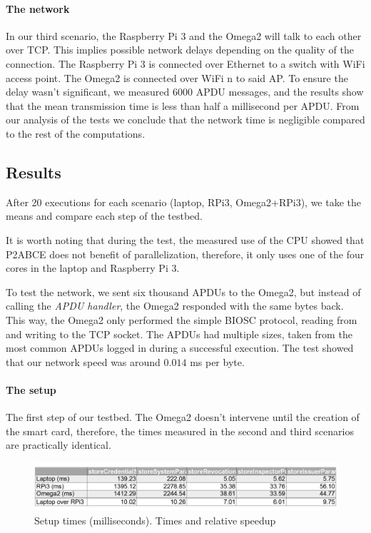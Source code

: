 \documentclass[journal]{IEEEtran}
\begin{document}
\paragraph{The network} In our third scenario, the Raspberry Pi 3 and the Omega2 will talk to each other over TCP. This implies possible network delays depending on the quality of the connection. The Raspberry Pi 3 is connected over Ethernet to a switch with WiFi access point. The Omega2 is connected over WiFi n to said AP. To ensure the delay wasn't significant, we measured 6000 APDU messages, and the results show that the mean transmission time is less than half a millisecond per APDU. From our analysis of the tests we conclude that the network time is negligible compared to the rest of the computations.



\subsection{Results}

After 20 executions for each scenario (laptop, RPi3, Omega2+RPi3), we take the means and compare each step of the testbed.

It is worth noting that during the test, the measured use of the CPU showed that P2ABCE does not benefit of parallelization, therefore, it only uses one of the four cores in the laptop and Raspberry Pi 3.

To test the network, we sent six thousand APDUs to the Omega2, but instead of calling the \textit{APDU handler}, the Omega2 responded with the same bytes back. This way, the Omega2 only performed the simple BIOSC protocol, reading from and writing to the TCP socket.
The APDUs had multiple sizes, taken from the most common APDUs logged in during a successful execution. The test showed that our network speed was around $0.014$ ms per byte.


\paragraph{The setup}\hfil

The first step of our testbed. The Omega2 doesn't intervene until the creation of the smart card, therefore, the times measured in the second and third scenarios are practically identical.

\begin{figure}[bth]
	\includegraphics[width=\linewidth]{gfx/graphics/setuptable}
	\caption{Setup times (milliseconds). Times and relative speedup}
	\label{fig:setup:graph}
\end{figure}
\end{document}
